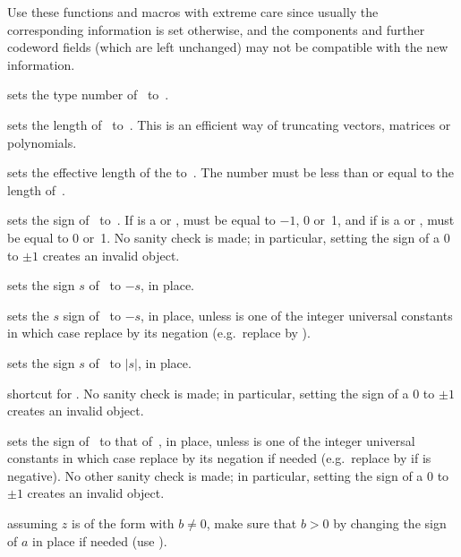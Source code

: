 Use these functions and macros with extreme care since usually the
corresponding information is set otherwise, and the components and further
codeword fields (which are left unchanged) may not be compatible with the new
information.

 sets the type number of~ to~.

 sets the length of~ to~. This
is an efficient way of truncating vectors, matrices or polynomials.

 sets the effective length
of the   to~. The number  must be less than or
equal to the length of~.

 sets the sign of~ to~.
If  is a  or ,  must be equal to $-1$, 0
or~1, and if  is a  or ,  must be equal to 0
or~1. No sanity check is made; in particular, setting the sign of a
$0$  to $\pm1$ creates an invalid object.

 sets the sign $s$ of~ to $-s$, in place.

 sets the $s$ sign of~ to $-s$, in
place, unless  is one of the integer universal constants in which case
replace  by its negation (e.g.~replace  by ).

 sets the sign $s$ of~ to $|s|$, in place.

 shortcut for .
No sanity check is made; in particular, setting the sign of a
$0$  to $\pm1$ creates an invalid object.

 sets the sign of~ to that
of~, in place, unless  is one of the integer universal
constants in which case replace  by its negation if needed
(e.g.~replace  by  if  is negative). No other
sanity check is made; in particular, setting the sign of a $0$
 to $\pm1$ creates an invalid object.

 assuming $z$ is of the form 
with $b\neq 0$, make sure that $b > 0$ by changing the sign of $a$ in place if
needed (use ).

